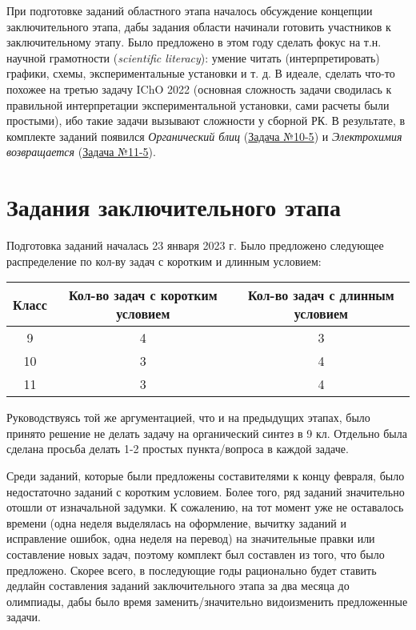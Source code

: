 При подготовке заданий областного этапа началось обсуждение концепции заключительного этапа, дабы задания области начинали готовить участников к заключительному этапу. Было предложено в этом году сделать фокус на т.н. научной грамотности (\textit{scientific literacy}): умение читать (интерпретировать)  графики, схемы, экспериментальные установки и т. д. В идеале, сделать что-то похожее на третью задачу IChO 2022 (основная сложность задачи сводилась к правильной интерпретации экспериментальной установки, сами расчеты были простыми), ибо такие задачи вызывают сложности у сборной РК. В результате, в комплекте заданий появился \textit{Органический блиц} (\href{https://olympiads.bc-pf.org/chemistry/oblast/2023/10}{Задача №10-5}) и \textit{Электрохимия возвращается} (\href{https://olympiads.bc-pf.org/chemistry/oblast/2023/11}{Задача №11-5}). 

\section{Задания заключительного этапа}

Подготовка заданий началась 23 января 2023 г. Было предложено следующее распределение по кол-ву задач с коротким и длинным условием:

\begin{table}[h]
    \centering
    \begin{tabular}{|c|c|c|}
        \hline
        Класс & Кол-во задач с коротким условием & Кол-во задач с длинным условием \\ \hline
        9 & 4 & 3 \\ \hline
        10 & 3 & 4 \\ \hline
        11 & 3 & 4 \\ \hline
    \end{tabular}
\end{table}

Руководствуясь той же аргументацией, что и на предыдущих этапах, было принято решение не делать задачу на органический синтез в 9 кл. Отдельно была сделана просьба делать 1-2 простых пункта/вопроса в каждой задаче.

Среди заданий, которые были предложены составителями к концу февраля, было недостаточно заданий с коротким условием. Более того, ряд заданий значительно отошли от изначальной задумки. К сожалению, на тот момент уже не оставалось времени (одна неделя выделялась на оформление, вычитку заданий и исправление ошибок, одна неделя на перевод) на значительные правки или составление новых задач, поэтому комплект был составлен из того, что было предложено. Скорее всего, в последующие годы рационально будет ставить дедлайн составления заданий заключительного этапа за два месяца до олимпиады, дабы было время заменить/значительно видоизменить предложенные задачи.